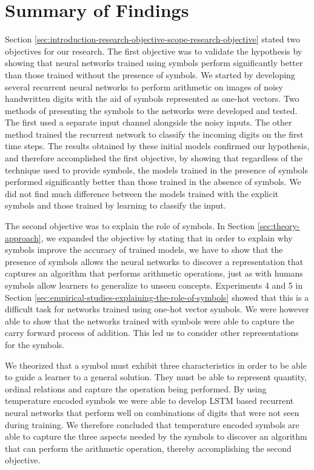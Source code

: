 \section{Summary of Findings} \label{sec:findings-and-conclusion-summary-of-findings}

Section \ref{sec:introduction-research-objective-scope-research-objective} stated two objectives for our research. The first objective was to validate the hypothesis by showing that neural networks trained using symbols perform significantly better than those trained without the presence of symbols. We started by developing several recurrent neural networks to perform arithmetic on images of noisy handwritten digits with the aid of symbols represented as one-hot vectors. Two methods of presenting the symbols to the networks were developed and tested. The first used a separate input channel alongside the noisy inputs. The other method trained the recurrent network to classify the incoming digits on the first time steps. The results obtained by these initial models confirmed our hypothesis, and therefore accomplished the first objective, by showing that regardless of the technique used to provide symbols, the models trained in the presence of symbols performed significantly better than those trained in the absence of symbols. We did not find much difference between the models trained with the explicit symbols and those trained by learning to classify the input.

The second objective was to explain the role of symbols. In Section \ref{sec:theory-approach}, we expanded the objective by stating that in order to explain why symbols improve the accuracy of trained models, we have to show that the presence of symbols allows the neural networks to discover a representation that captures an algorithm that performs arithmetic operations, just as with humans symbols allow learners to generalize to unseen concepts. Experiments 4 and 5 in Section \ref{sec:empirical-studies-explaining-the-role-of-symbols} showed that this is a difficult task for networks trained using one-hot vector symbols. We were however able to show that the networks trained with symbols were able to capture the carry forward process of addition. This led us to consider other representations for the symbols.

We theorized that a symbol must exhibit three characteristics in order to be able to guide a learner to a general solution. They must be able to represent quantity, ordinal relations and capture the operation being performed. By using temperature encoded symbols we were able to develop LSTM based recurrent neural networks that perform well on combinations of digits that were not seen during training. We therefore concluded that temperature encoded symbols are able to capture the three aspects needed by the symbols to discover an algorithm that can perform the arithmetic operation, thereby accomplishing the second objective. 